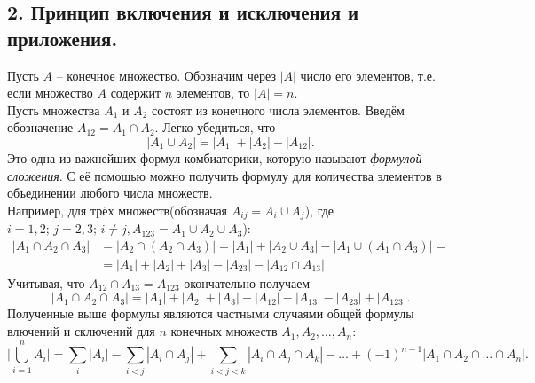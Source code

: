 \documentclass[a4paper,12pt]{article}
\theoremstyle{plain}
\theoremstyle{definition}
\theoremstyle{remark}
\begin{document}

\subsection*{2. Принцип включения и исключения и приложения.}
\indent
Пусть $A$ -- конечное множество.
Обозначим через $|A|$ число его элементов,
т.е. если множество $A$ содержит $n$ элементов,
то $|A| = n$.
\\ \indent
Пусть множества $A_1$ и $A_2$ состоят из 
конечного числа элементов.
Введём обозначение $A_{12} = A_1 \cap A_2$.
Легко убедиться, что
\[
|A_1 \cup A_2| =
|A_1|+|A_2|-|A_{12}|.
\]
Это одна из важнейших формул комбиаторики,
которую называют \textit{формулой сложения}.
С её помощью можно получить формулу для
количества элементов в объединении любого числа множеств.
\\ \indent
Например, для трёх множеств(обозначая $A_{ij} = A_i \cup A_j$),
где $i = 1,2; \, j = 2, 3; \, i \neq j, A_{123} =
A_1 \cup A_2 \cup A_3$):
\begin{equation*}
\begin{split}
|A_1 \cap A_2 \cap A_3| &= 
|A_2 \cap (A_2 \cap A_3)| = 
|A_1| + |A_2 \cup A_3| - 
|A_1 \cup (A_1 \cap A_3)| = \\
&= |A_1| + |A_2| + |A_3| - |A_{23}| -
|A_{12} \cap A_{13}|
\end{split}
\end{equation*}
Учитывая, что $A_{12} \cap A_{13} = A_{123}$
окончательно получаем
\[
|A_1 \cap A_2 \cap A_3| = 
|A_1| + |A_2| + |A_3| -
|A_{12}| - |A_{13}| - |A_{23}| + |A_{123}|.
\]
Полученные выше формулы являются частными случаями общей
формулы влючений и сключений для $n$ конечных
множеств $A_1, A_2, \ldots, A_n$:
\[
\biggl | \bigcup_{i=1}^{n}A_i \biggl | = \sum_{i} | A_i | - \sum_{i<j} | A_i \cap A_j | + \sum_{i<j<k} | A_i \cap A_j \cap A_k | - \ldots + (-1)^{n-1} | A_1 \cap A_2 \cap \ldots \cap A_n |.
\]
\newpage
\end{document}
